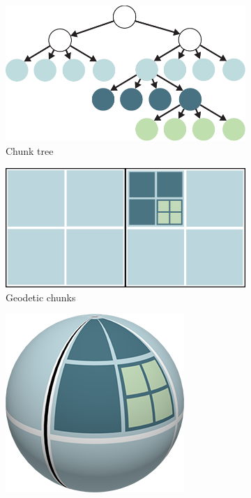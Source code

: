 \begin{figure}[htbp]
    \centering
    \begin{subfigure}[b]{0.3\textwidth}
        \includegraphics[width=\textwidth]{figures/chunkedlod/chunkedlodtree.pdf}
        \caption{Chunk tree}
    \end{subfigure}
    \quad
    \begin{subfigure}[b]{0.3\textwidth}
        \includegraphics[width=\textwidth]{figures/chunkedlod/tiled.png}
        \caption{Geodetic chunks}
    \end{subfigure}
    \quad
    \begin{subfigure}[b]{0.2\textwidth}
        \includegraphics[width=\textwidth]{figures/chunkedlod/tiled_globe.png}

\end{subfigure}
\end{figure}
